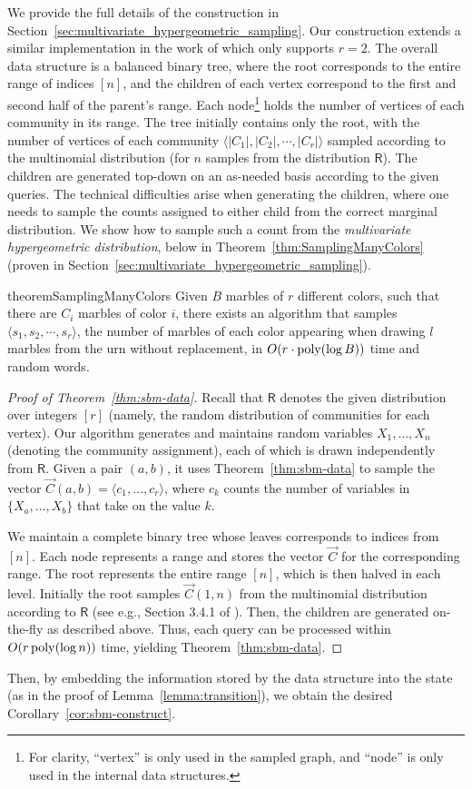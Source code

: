 We provide the full details of the construction in Section~\ref{sec:multivariate_hypergeometric_sampling}.
Our construction extends a similar implementation in the work of \cite{huge} which only supports $r = 2$.
The overall data structure is a balanced binary tree, where the root corresponds to the entire range of indices $[n]$,
and the children of each vertex correspond to the first and second half of the parent's range.
Each node\footnote{For clarity, ``vertex'' is only used in the sampled graph, and ``node'' is only used in the internal data structures.}
holds the number of vertices of each community in its range.
The tree initially contains only the root, with the number of vertices of each community $\langle |C_1|, |C_2|,\cdots, |C_r| \rangle$
sampled according to the multinomial distribution (for $n$ samples from the distribution $\mathsf{R}$).
The children are generated top-down on an as-needed basis according to the given queries.
The technical difficulties arise when generating the children,
where one needs to sample the counts assigned to either child from the correct marginal distribution.
We show how to sample such a count from the \emph{multivariate hypergeometric distribution},
below in Theorem~\ref{thm:SamplingManyColors} (proven in Section~\ref{sec:multivariate_hypergeometric_sampling}).

\begin{restatable}{theorem}{SamplingManyColors}
\label{thm:SamplingManyColors}
Given $B$ marbles of $r$ different colors, such that there are $C_i$ marbles of color $i$,
there exists an algorithm that samples $\langle s_1, s_2,\cdots, s_r \rangle$,
the number of marbles of each color appearing when drawing $l$ marbles from the urn without replacement,
in $O(r\cdot\mathrm{poly}(\log B))$ time and random words.
\end{restatable}
\begin{proof}[Proof of Theorem~\ref{thm:sbm-data}]
Recall that $\mathsf{R}$ denotes the given distribution over integers $[r]$ (namely, the random distribution of communities for each vertex).
Our algorithm generates and maintains random variables $X_1, \ldots, X_n$ (denoting the community assignment),
each of which is drawn independently from $\mathsf{R}$.
Given a pair $(a, b)$, it uses Theorem~\ref{thm:sbm-data} to sample the vector $\vec{C}(a, b) = \langle c_1, \ldots, c_r \rangle$,
where $c_k$ counts the number of variables in $\{X_a, \ldots, X_b\}$ that take on the value $k$.

We maintain a complete binary tree whose leaves corresponds to indices from $[n]$.
Each node represents a range and stores the vector $\vec{C}$ for the corresponding range.
The root represents the entire range $[n]$, which is then halved in each level.
Initially the root samples $\vec{C}(1, n)$ from the multinomial distribution according to $\mathsf{R}$
(see e.g., Section 3.4.1 of \cite{knuth}).
Then, the children are generated on-the-fly as described above.
Thus, each query can be processed within $O(r\,\mathrm{poly}(\log n))$ time, yielding Theorem~\ref{thm:sbm-data}.
\end{proof}

Then, by embedding the information stored by the data structure into the state (as in the proof of Lemma~\ref{lemma:transition}),
we obtain the desired Corollary~\ref{cor:sbm-construct}.

